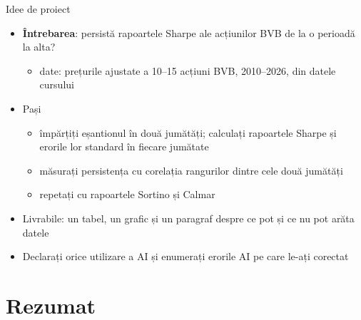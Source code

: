 \begin{frame}{Idee de proiect}
\itemsize{\small}
\begin{itemize}
    \item \textbf{Întrebarea}: persistă rapoartele Sharpe ale acțiunilor BVB de la o perioadă la alta?
    \begin{itemize}
        \item date: prețurile ajustate a 10--15 acțiuni BVB, 2010--2026, din datele cursului
    \end{itemize}
    \item Pași
    \begin{itemize}
        \item împărțiți eșantionul în două jumătăți; calculați rapoartele Sharpe și erorile lor standard în fiecare jumătate
        \item măsurați persistența cu corelația rangurilor dintre cele două jumătăți
        \item repetați cu rapoartele Sortino și Calmar
    \end{itemize}
    \item Livrabile: un tabel, un grafic și un paragraf despre ce pot și ce nu pot arăta datele
    \item Declarați orice utilizare a AI și enumerați erorile AI pe care le-ați corectat
\end{itemize}
\end{frame}


\section{Rezumat}

